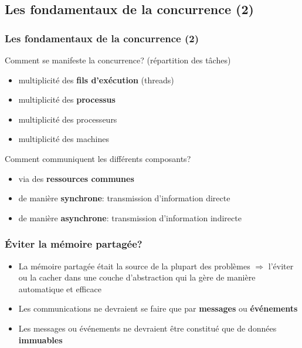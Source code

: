 \documentclass{beamer}
\begin{document}
\subsection{Les fondamentaux de la concurrence (2)}
\begin{frame}
  \frametitle{Les fondamentaux de la concurrence (2)}
  Comment se manifeste la concurrence? (répartition des tâches)
  \begin{itemize}
  \item multiplicité des \textbf{fils d'exécution} (threads)
  \item multiplicité des \textbf{processus}
  \item<2-> multiplicité des processeurs
  \item<2-> multiplicité des machines
  \end{itemize}

  Comment communiquent les différents composants?
  \begin{itemize}
  \item via des \textbf{ressources communes}
  \item<3-> de manière \textbf{synchrone}: transmission d'information directe
  \item<3-> de manière \textbf{asynchrone}: transmission d'information indirecte
  \end{itemize}
\end{frame} %
\begin{frame}
  \frametitle{Éviter la mémoire partagée?}
  \begin{itemize}
  \item La mémoire partagée était la source de la plupart des problèmes
    \bigskip
    $\Rightarrow$ l'éviter ou la cacher dans une couche d'abstraction qui la
    gère de manière automatique et efficace
  \item Les communications ne devraient se faire que par \textbf{messages} ou \textbf{événements}
  \item Les messages ou événements ne devraient être constitué que de données \textbf{immuables}
  \end{itemize}
\end{frame}
\end{document}
